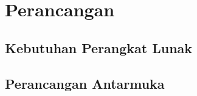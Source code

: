 \chapter{Perancangan}
\label{chap: Perancangan}

\section{Kebutuhan Perangkat Lunak}
\label{sec: Kebutuhan Perangkat Lunak}


\section{Perancangan Antarmuka}
\label{sec: Perancangan Antarmuka}

